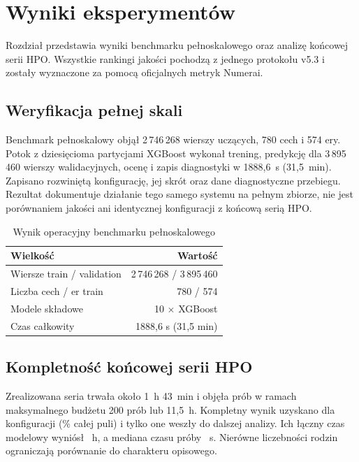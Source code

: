 \chapter{Wyniki eksperymentów}

Rozdział przedstawia wyniki benchmarku pełnoskalowego oraz analizę końcowej serii
HPO. Wszystkie rankingi jakości pochodzą z jednego protokołu v5.3 i zostały
wyznaczone za pomocą oficjalnych metryk Numerai.

\section{Weryfikacja pełnej skali}
Benchmark pełnoskalowy objął 2\,746\,268 wierszy uczących, 780 cech i 574 ery.
Potok z dziesięcioma partycjami XGBoost wykonał trening, predykcję dla
3\,895\,460 wierszy walidacyjnych, ocenę i zapis diagnostyki w 1888,6~s
(31,5~min). Zapisano rozwiniętą konfigurację, jej skrót oraz dane diagnostyczne
przebiegu. Rezultat dokumentuje działanie tego samego systemu na pełnym zbiorze,
nie jest porównaniem jakości ani identycznej konfiguracji z końcową serią HPO.

\begin{table}[htbp]
\centering
\caption[Wynik benchmarku pełnoskalowego]{Wynik operacyjny benchmarku pełnoskalowego}
\label{tab:full-scale-result}
\begin{tabular}{lr}
\toprule
Wielkość & Wartość \\
\midrule
Wiersze train / validation & 2\,746\,268 / 3\,895\,460 \\
Liczba cech / er train & 780 / 574 \\
Modele składowe & 10 $\times$ XGBoost \\
Czas całkowity & 1888,6 s (31,5 min) \\
\bottomrule
\end{tabular}
\sourceown
\end{table}

\section{Kompletność końcowej serii HPO}
Zrealizowana seria trwała około 1~h 43~min i objęła \FinalTrialsLaunched{} prób
w ramach maksymalnego budżetu 200 prób lub 11,5~h. Kompletny wynik uzyskano dla
\FinalTrialsCompleted{} konfiguracji (\FinalCompletionRate\% całej puli) i tylko
one weszły do dalszej analizy. Ich łączny czas modelowy wyniósł
\FinalCompletedComputeHours{}~h, a mediana czasu próby \FinalMedianRuntime{}~s.
Nierówne liczebności rodzin ograniczają porównanie do charakteru opisowego.

